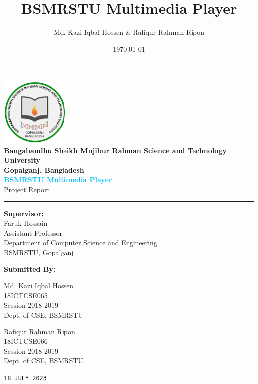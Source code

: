 \documentclass{report}
\title{BSMRSTU Multimedia Player}
\author{Md. Kazi Iqbal Hossen \& Rafiqur Rahman Ripon}
\date{\today}
\begin{document}
\thispagestyle{empty}

\begin{center}
  {
  \includegraphics[width=1.3in]{img/logo.png} \\ [0.5cm]
  \textbf{\Large Bangabandhu Sheikh Mujibur Rahman Science and Technology University}\\[0.15cm]
  \textbf{Gopalganj, Bangladesh}\\ [0.8cm]

  {\bf\Large {\textcolor{DeepSkyBlue}{BSMRSTU Multimedia Player}}} \\[0.15cm]
  {\large {Project Report} } \\

  \vspace*{1cm}

  \textcolor{red}{\rule{\textwidth}{3pt}}
  \vspace*{0.7cm}

  {\bf\large Supervisor: } \\ [0.4cm]
  Faruk Hossain \\
  Assistant Professor \\
  Department of Computer Science and Engineering \\
  BSMRSTU, Gopalganj \\

  \vspace*{1.1cm}

  {\bf\large Submitted By:} \\ [0.6cm]
  \begin{minipage}{0.4\textwidth}
    \begin{flushleft} \normalsize
      Md. Kazi Iqbal Hossen \\
      18ICTCSE065\\
      Session 2018-2019\\
      Dept. of CSE, BSMRSTU\\
    \end{flushleft}
  \end{minipage}
  \begin{minipage}{0.4\textwidth}
    \begin{flushright} \normalsize
      Rafiqur Rahman Ripon\\
      18ICTCSE066\\
      Session 2018-2019\\
      Dept. of CSE, BSMRSTU\\
    \end{flushright}
  \end{minipage}

  \vfill

  \texttt{18 JULY 2023}
  }
\end{center}
\end{document}
